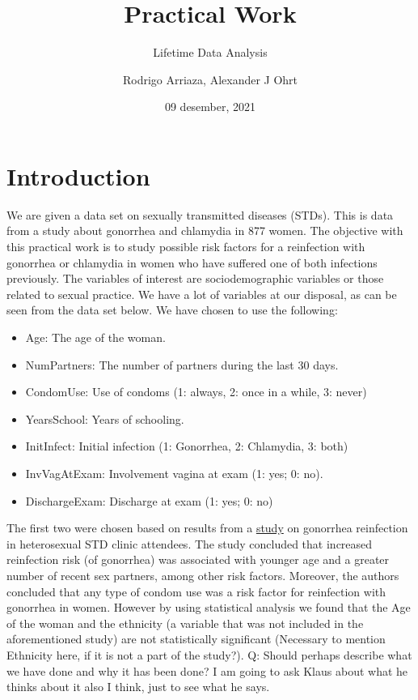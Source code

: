 \documentclass[
]{article}
\title{Practical Work}
\subtitle{Lifetime Data Analysis}
\author{Rodrigo Arriaza, Alexander J Ohrt}
\date{09 desember, 2021}
\providecommand{\tightlist}{%
  \setlength{\itemsep}{0pt}\setlength{\parskip}{0pt}}
\begin{document}
\maketitle

\hypertarget{introduction}{%
\section{Introduction}\label{introduction}}

We are given a data set on sexually transmitted diseases (STDs). This is data from a study about gonorrhea and chlamydia in 877 women. The objective with this practical work is to study possible risk factors for a reinfection with gonorrhea or chlamydia in women who have suffered one of both infections previously. The variables of interest are sociodemographic variables or those related to sexual practice. We have a lot of variables at our disposal, as can be seen from the data set below. We have chosen to use the following:

\begin{itemize}
\tightlist
\item
  Age: The age of the woman.
\item
  NumPartners: The number of partners during the last 30 days.
\item
  CondomUse: Use of condoms (1: always, 2: once in a while, 3: never)
\item
  YearsSchool: Years of schooling.
\item
  InitInfect: Initial infection (1: Gonorrhea, 2: Chlamydia, 3: both)
\item
  InvVagAtExam: Involvement vagina at exam (1: yes; 0: no).
\item
  DischargeExam: Discharge at exam (1: yes; 0: no)
\end{itemize}

The first two were chosen based on results from a \href{https://www.ncbi.nlm.nih.gov/pmc/articles/PMC1744639/}{study} on gonorrhea reinfection in heterosexual STD clinic attendees. The study concluded that increased reinfection risk (of gonorrhea) was associated with younger age and a greater number of recent sex partners, among other risk factors. Moreover, the authors concluded that any type of condom use was a risk factor for reinfection with gonorrhea in women. However by using statistical analysis we found that the Age of the woman and the ethnicity (a variable that was not included in the aforementioned study) are not statistically significant (Necessary to mention Ethnicity here, if it is not a part of the study?). Q: Should perhaps describe what we have done and why it has been done? I am going to ask Klaus about what he thinks about it also I think, just to see what he says.
\end{document}
